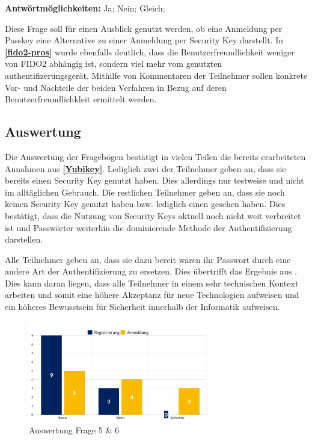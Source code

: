\textbf{Antwörtmöglichkeiten:} Ja; Nein; Gleich;

Diese Frage soll für einen Ausblick genutzt werden, ob eine Anmeldung per Passkey eine Alternative zu einer Anmeldung per Security Key darstellt. In \textbf{\ref{fido2-pros}} wurde ebenfalls deutlich, dass die Benutzerfreundlichkeit weniger von \ac{FIDO}2 abhängig ist, sondern viel mehr vom genutzten authentifizerungsgerät.  Mithilfe von Kommentaren der Teilnehmer sollen konkrete Vor- und Nachteile der beiden Verfahren in Bezug auf deren Benutzerfreundlichkleit ermittelt werden.


\subsection{Auswertung}
Die Auswertung der Fragebögen bestätigt in vielen Teilen die bereits erarbeiteten Annahmen aus \textbf{\ref{Yubikey}}. Lediglich zwei der Teilnehmer geben an, dass sie bereits einen Security Key genutzt haben. Dies allerdings nur testweise und nicht im alltäglichen Gebrauch. Die restlichen Teilnehmer geben an, dass sie noch keinen Security Key genutzt haben bzw. lediglich einen gesehen haben. Dies bestätigt, dass die Nutzung von Security Keys aktuell noch nicht weit verbreitet ist und Passwörter weiterhin die dominierende Methode der Authentifizierung darstellen.

Alle Teilnehmer geben an, dass sie dazu bereit wären ihr Passwort durch eine andere Art der Authentifizierung zu ersetzen. Dies übertrifft das Ergebnis aus \cite{techstat}. Dies kann daran liegen, dass alle Teilnehmer in einem sehr technischen Kontext arbeiten und somit eine höhere Akzeptanz für neue Technologien aufweisen und ein höheres Bewusstsein für Sicherheit innerhalb der Informatik aufweisen. 

\begin{figure}[H]
	\centering 
	\includegraphics[width=0.7\textwidth]{img/abbildungen/chart_anmeldung_register.png}
	\captionsetup{format=hang}
	\caption{Auswertung Frage 5 \& 6}
\end{figure}


